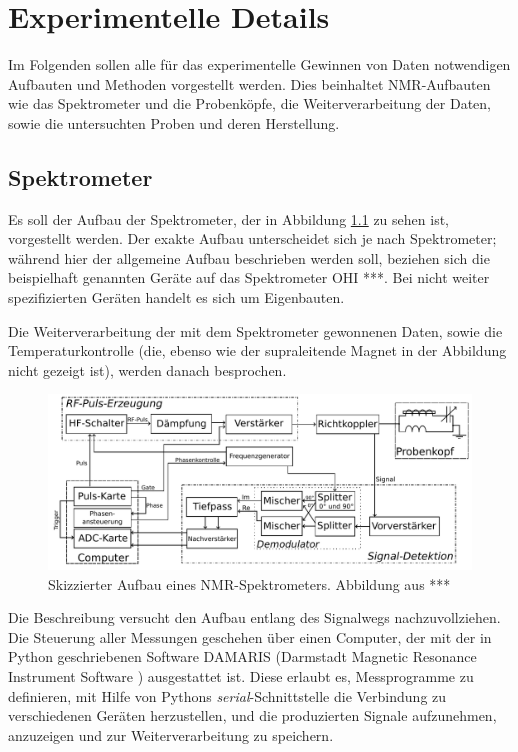 \chapter{Experimentelle Details} \label{chapter:exp_details}

Im Folgenden sollen alle für das experimentelle Gewinnen von Daten notwendigen Aufbauten und Methoden vorgestellt werden. Dies beinhaltet NMR-Aufbauten wie das Spektrometer und die Probenköpfe, die Weiterverarbeitung der Daten, sowie die untersuchten Proben und deren Herstellung.

\section{Spektrometer} \label{section:exp:spektrometer}

Es soll der Aufbau der Spektrometer, der in Abbildung \ref{fig:exp:aufbau} zu sehen ist, vorgestellt werden. Der exakte Aufbau unterscheidet sich je nach Spektrometer; während hier der allgemeine Aufbau beschrieben werden soll, beziehen sich die beispielhaft genannten Geräte auf das Spektrometer OHI ***. Bei nicht weiter spezifizierten Geräten handelt es sich um Eigenbauten.

Die Weiterverarbeitung der mit dem Spektrometer gewonnenen Daten, sowie die Temperaturkontrolle (die, ebenso wie der supraleitende Magnet in der Abbildung nicht gezeigt ist), werden danach besprochen.

\begin{figure}
	\begin{center}
		\includegraphics[width=\textwidth]{graphics/joachim/aufbau.pdf}
	\end{center}
	\caption{Skizzierter Aufbau eines NMR-Spektrometers. Abbildung aus *** \cite[S. 29]{lueg_implementierung_2016}} \label{fig:exp:aufbau}
\end{figure}

Die Beschreibung versucht den Aufbau entlang des Signalwegs nachzuvollziehen. Die Steuerung aller Messungen geschehen über einen Computer, der mit der in Python geschriebenen Software DAMARIS (Darmstadt Magnetic Resonance Instrument Software \cite{gadke_damaris_2007}) ausgestattet ist. Diese erlaubt es, Messprogramme zu definieren, mit Hilfe von Pythons \emph{serial}-Schnittstelle die Verbindung zu verschiedenen Geräten herzustellen, und die produzierten Signale aufzunehmen, anzuzeigen und zur Weiterverarbeitung zu speichern.

